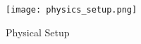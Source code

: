 ﻿\documentclass[reprint,amsmath,amssymb,aps]{revtex4-2}
\begin{document}
\begin{figure}
\begin{center}
\texttt{[image: physics\_setup.png]}
\end{center}
\caption{\label{fig:setup} Physical Setup}
\end{figure}

%
\end{document}
